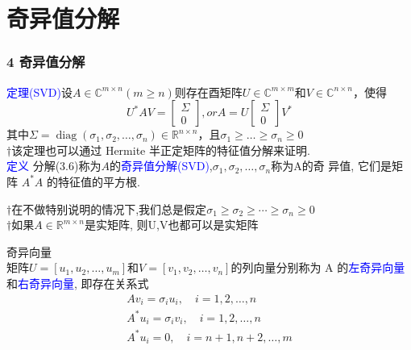 \documentclass[notheorems,serif]{beamer}
\begin{document}
\section{奇异值分解}
\begin{frame}
\frametitle{4 奇异值分解}
\textcolor{blue}{定理(SVD)}设$A \in \mathbb{C}^{m \times n}(m \geq n)$则存在酉矩阵$U \in \mathbb{C}^{m \times m}$和$V \in \mathbb{C}^{n \times n}$，使得
\begin{equation}
U^{*} A V=\left[\begin{array}{l}{\Sigma} \\ {0}\end{array}\right],orA=U\left[\begin{array}{l}{\Sigma} \\ {0}\end{array}\right] V^{*}
\end {equation}
其中$\Sigma=\operatorname{diag}\left(\sigma_{1}, \sigma_{2}, \ldots, \sigma_{n}\right) \in \mathbb{R}^{n \times n}$，且$\sigma_{1} \geq \ldots \geq \sigma_{n} \geq 0$\\

$\dagger$该定理也可以通过 Hermite 半正定矩阵的特征值分解来证明.\\

\textcolor{blue}{定义} 分解(3.6)称为$A$的\textcolor{blue}{奇异值分解(SVD)},$\sigma_{1}, \sigma_{2}, \dots, \sigma_{n}$称为A的奇 异值, 它们是矩阵 $A^{*}A$ 的特征值的平方根.
\end{frame}

\begin{frame}
$\dagger$在不做特别说明的情况下,我们总是假定$\sigma_{1} \geq \sigma_{2} \geq \cdots \geq \sigma_{n} \geq 0$\\
$\dagger$如果$A \in \mathbb{R}^{m \times n}$是实矩阵, 则U,V也都可以是实矩阵

\noindent 奇异向量\\
矩阵$U=\left[u_{1}, u_{2}, \ldots, u_{m}\right]$和$V=\left[v_{1}, v_{2}, \ldots, v_{n}\right]$的列向量分别称为 A 的\textcolor{blue}{左奇异向量}和\textcolor{blue}{右奇异向量}, 即存在关系式
$$
\begin{array}{l}{A v_{i}=\sigma_{i} u_{i}, \quad i=1,2, \ldots, n} \\ {A^{*} u_{i}=\sigma_{i} v_{i}, \quad i=1,2, \ldots, n} \\ {A^{*} u_{i}=0, \quad i=n+1, n+2, \ldots, m}\end{array}
$$
\end{frame}
\end{document}
